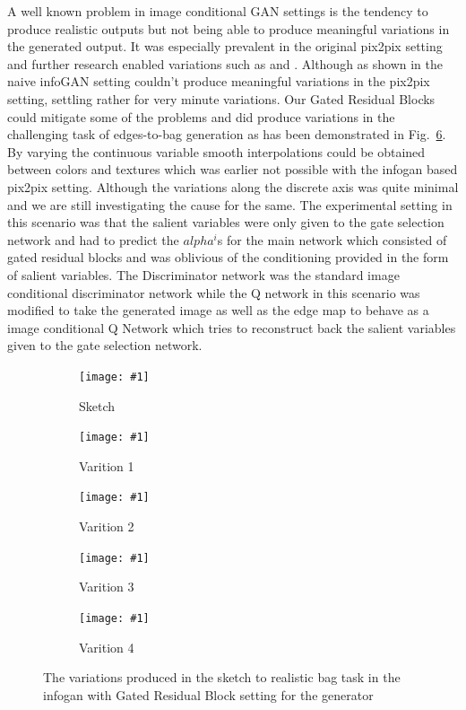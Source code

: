 \documentclass[10pt,twocolumn,letterpaper]{article}
\def\figref#1{Fig.~\ref{#1}}
\begin{document}
A well known problem in image conditional GAN settings is the tendency to produce realistic outputs but not being able to produce meaningful variations in the generated output. It was especially prevalent in the original pix2pix setting \cite{isola2016image2image} and further research enabled variations such as \cite{ghosh2017multi} and \cite{zhu2017toward}. Although as shown in \cite{ghosh2017multi} the naive infoGAN setting couldn't produce meaningful variations in the pix2pix setting, settling rather for very minute variations. Our Gated Residual Blocks could mitigate some of the problems and did produce variations in the challenging task of edges-to-bag generation as has been demonstrated in \figref{fig:infogan_bags}. By varying the continuous variable smooth interpolations could be obtained between colors and textures which was earlier not possible with the infogan based pix2pix setting. Although the variations along the discrete axis was quite minimal and we are still investigating the cause for the same. The experimental setting in this scenario was that the salient variables were only given to the gate selection network and had to predict the $alpha^i$s for the main network which consisted of gated residual blocks and was oblivious of the conditioning provided in the form of salient variables. The Discriminator network was the standard image conditional discriminator network while the Q network in this scenario was modified to take the generated image as well as the edge map to behave as a image conditional Q Network which tries to reconstruct back the salient variables given to the gate selection network. 

\newcommand{\addSubFigEighth}[3]{\begin{subfigure}[t]{.18\linewidth}
   \texttt{[image: \#1]}
   \caption{#2}\label{#3}\end{subfigure}
}
\begin{figure}%
    \centering
    \addSubFigEighth{Picture8}{Sketch}{fig:bag_sketch} 
    \addSubFigEighth{Picture9}{Varition 1}{fig:bag_1} 
    \addSubFigEighth{Picture10}{Varition 2}{fig:bag_2}
    \addSubFigEighth{Picture11}{Varition 3}{fig:bag_3}
    \addSubFigEighth{Picture12}{Varition 4}{fig:bag_4}
    \caption{The variations produced in the sketch to realistic bag task in the infogan with Gated Residual Block setting for the generator }
    \label{fig:infogan_bags}
    \vspace{-3mm}
\end{figure}
\end{document}
